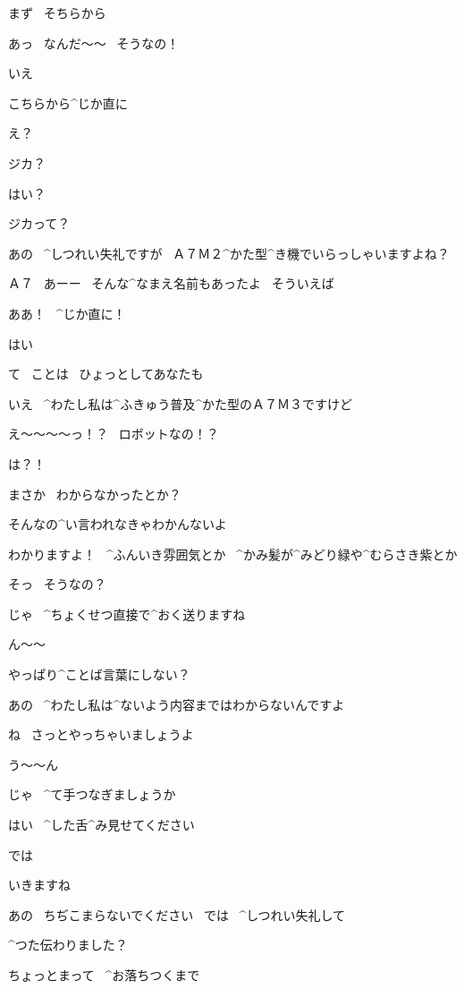 \Kokone まず
\ そちらから

\Alpha あっ
\ なんだ〜〜
\ そうなの！

\Kokone いえ

\Kokone こちらから^{じか}{直}に

\Alpha え？

\Alpha ジカ？

\Kokone はい？

\Alpha ジカって？

\page[8]
\Kokone あの
\ ^{しつれい}{失礼}ですが
\ Ａ７Ｍ２^{かた}{型}^{き}{機}でいらっしゃいますよね？

\Alpha Ａ７
\ あーー
\ そんな^{なまえ}{名前}もあったよ
\ そういえば

\Alpha ああ！
\ ^{じか}{直}に！

\Kokone はい

\Alpha て
\ ことは
\ ひょっとしてあなたも

\Kokone いえ
\ ^{わたし}{私}は^{ふきゅう}{普及}^{かた}{型}のＡ７Ｍ３ですけど

\page[9]
\Alpha え〜〜〜〜っ！？
\ ロボットなの！？

\Kokone は？！

\Kokone まさか
\ わからなかったとか？

\Alpha そんなの^{い}{言}われなきゃわかんないよ

\Kokone わかりますよ！
\ ^{ふんいき}{雰囲気}とか
\ ^{かみ}{髪}が^{みどり}{緑}や^{むらさき}{紫}とか

\Alpha そっ
\ そうなの？

\page[10]
\Kokone じゃ
\ ^{ちょくせつ}{直接}で^{おく}{送}りますね

\Alpha ん〜〜

\Alpha やっぱり^{ことば}{言葉}にしない？

\Kokone あの
\ ^{わたし}{私}は^{ないよう}{内容}まではわからないんですよ

\Kokone ね
\ さっとやっちゃいましょうよ

\Alpha う〜〜ん

\page[11]
\Kokone じゃ
\ ^{て}{手}つなぎましょうか

\Kokone はい
\ ^{した}{舌}^{み}{見}せてください

\Kokone では

\Kokone いきますね

\Kokone あの
\ ちぢこまらないでください
\ では
\ ^{しつれい}{失礼}して

\page[12]
\Kokone ^{つた}{伝}わりました？

\Alpha ちょっとまって
\ ^{お}{落}ちつくまで

